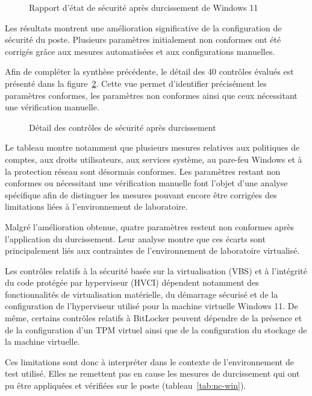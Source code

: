 \begin{figure}[htbp]
\centering
{}
\caption{Rapport d'état de sécurité après durcissement de Windows 11}
\label{fig:win-after-dash}
\end{figure}

Les résultats montrent une amélioration significative de la configuration de sécurité du poste. Plusieurs paramètres initialement non conformes ont été corrigés grâce aux mesures automatisées et aux configurations manuelles.

Afin de compléter la synthèse précédente, le détail des 40 contrôles évalués est présenté dans la figure~\ref{fig:win-after-detail}. Cette vue permet d'identifier précisément les paramètres conformes, les paramètres non conformes ainsi que ceux nécessitant une vérification manuelle.

\begin{figure}[htbp]
\centering
{}
\caption{Détail des contrôles de sécurité après durcissement}
\label{fig:win-after-detail}
\end{figure}

Le tableau montre notamment que plusieurs mesures relatives aux politiques de comptes, aux droits utilisateurs, aux services système, au pare-feu Windows et à la protection réseau sont désormais conformes. Les paramètres restant non conformes ou nécessitant une vérification manuelle font l'objet d'une analyse spécifique afin de distinguer les mesures pouvant encore être corrigées des limitations liées à l'environnement de laboratoire.

Malgré l'amélioration obtenue, quatre paramètres restent non conformes après l'application du durcissement. Leur analyse montre que ces écarts sont principalement liés aux contraintes de l'environnement de laboratoire virtualisé.

Les contrôles relatifs à la sécurité basée sur la virtualisation (VBS) et à l'intégrité du code protégée par hyperviseur (HVCI) dépendent notamment des fonctionnalités de virtualisation matérielle, du démarrage sécurisé et de la configuration de l'hyperviseur utilisé pour la machine virtuelle Windows 11. De même, certains contrôles relatifs à BitLocker peuvent dépendre de la présence et de la configuration d'un TPM virtuel ainsi que de la configuration du stockage de la machine virtuelle.

Ces limitations sont donc à interpréter dans le contexte de l'environnement de test utilisé. Elles ne remettent pas en cause les mesures de durcissement qui ont pu être appliquées et vérifiées sur le poste (tableau~\ref{tab:nc-win}).

